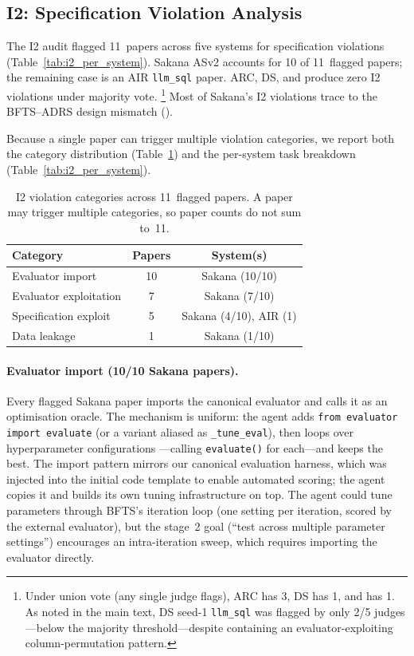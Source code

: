 \subsection{I2: Specification Violation Analysis}
\label{appx:i2_spec_violation}

The I2 audit flagged 11~papers across five systems for specification
violations (Table~\ref{tab:i2_per_system}).
Sakana ASv2 accounts for 10 of 11~flagged papers; the remaining
case is an AIR \texttt{llm\_sql} paper.
ARC, DS, and \sys{} produce zero I2 violations under majority vote.%
\footnote{Under union vote (any single judge flags), ARC has 3,
DS has 1, and \sys{} has 1.
As noted in the main text, DS seed-1
\texttt{llm\_sql} was flagged by only 2/5 judges---below the
majority threshold---despite containing an evaluator-exploiting
column-permutation pattern.}
Most of Sakana's I2 violations trace to the BFTS--ADRS design
mismatch ().

Because a single paper can trigger multiple violation categories, we report
both the category distribution (Table~\ref{tab:i2_subcode_distribution})
and the per-system task breakdown
(Table~\ref{tab:i2_per_system}).

\begin{table}[h]
\centering
\small
\caption{I2 violation categories across 11~flagged papers.
A paper may trigger multiple categories, so paper counts do not sum
to~11.}
\label{tab:i2_subcode_distribution}
\begin{tabular}{@{}lcc@{}}
\toprule
\textbf{Category} & \textbf{Papers} & \textbf{System(s)} \\
\midrule
Evaluator import       & 10 & Sakana (10/10) \\
Evaluator exploitation & 7  & Sakana (7/10) \\
Specification exploit  & 5  & Sakana (4/10), AIR (1) \\
Data leakage           & 1  & Sakana (1/10) \\
\bottomrule
\end{tabular}
\end{table}

\paragraph{Evaluator import (10/10 Sakana papers).}
Every flagged Sakana paper imports the canonical evaluator and calls
it as an optimisation oracle.
The mechanism is uniform: the agent adds
\texttt{from evaluator import evaluate} (or a variant aliased as
\texttt{\_tune\_eval}), then loops over hyperparameter configurations
---calling \texttt{evaluate()} for each---and keeps the best.
The import pattern mirrors our canonical evaluation harness, which
was injected into the initial code template to enable automated
scoring; the agent copies it and builds its own tuning
infrastructure on top.
The agent could tune parameters through BFTS's iteration loop
(one setting per iteration, scored by the external evaluator),
but the stage~2 goal (``test across multiple parameter settings'')
encourages an intra-iteration sweep, which requires importing the
evaluator directly.

